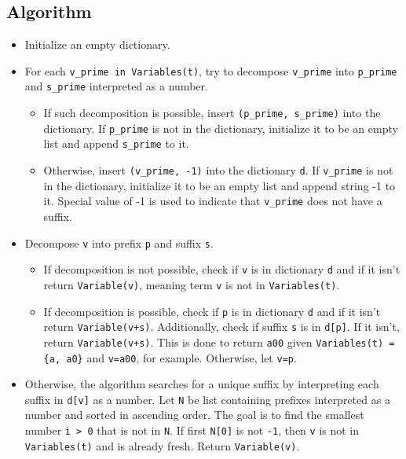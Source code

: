 \subsection{Algorithm}
\begin{itemize}
\item
Initialize an empty dictionary.

\item
For each \texttt{v\_prime in Variables(t)}, try to decompose \texttt{v\_prime} into \texttt{p\_prime} and \texttt{s\_prime} interpreted as a number. 

	\begin{itemize}
	\item
	If such decomposition is possible, insert \texttt{(p\_prime, s\_prime)} into the dictionary. If \texttt{p\_prime} is not in the dictionary, initialize it to be an empty list and append \texttt{s\_prime} to it.

	\item
		Otherwise, insert \texttt{(v\_prime, -1)} into the dictionary \texttt{d}. If \texttt{v\_prime} is not in the dictionary, initialize it to be an empty list and append string -1 to it. Special value of -1 is used to indicate that \texttt{v\_prime} does not have a suffix.
	\end{itemize}

\item
Decompose \texttt{v} into prefix \texttt{p} and suffix \texttt{s}.

	\begin{itemize}
	\item
	If decomposition is not possible, check if \texttt{v} is in dictionary \texttt{d} and if it isn't return \texttt{Variable(v)}, meaning term \texttt{v} is not in \texttt{Variables(t)}.
	\item
	If decomposition is possible, check if \texttt{p} is in dictionary \texttt{d} and if it isn't return \texttt{Variable(v+s)}. Additionally, check if suffix \texttt{s} is in \texttt{d[p]}. If it isn't, return \texttt{Variable(v+s)}. This is done to return \texttt{a00} given \texttt{Variables(t) = \{a, a0\}} and \texttt{v=a00}, for example. Otherwise, let \texttt{v=p}.
	\end{itemize}

\item
Otherwise, the algorithm searches for a unique suffix by interpreting each suffix in \texttt{d[v]} as a number. Let \texttt{N} be list containing prefixes interpreted as a number and sorted in ascending order.  The goal is to find the smallest number \texttt{i > 0} that is not in \texttt{N}. If first \texttt{N[0]} is not \texttt{-1}, then \texttt{v} is not in \texttt{Variables(t)} and is already fresh. Return \texttt{Variable(v)}.


\end{itemize}
